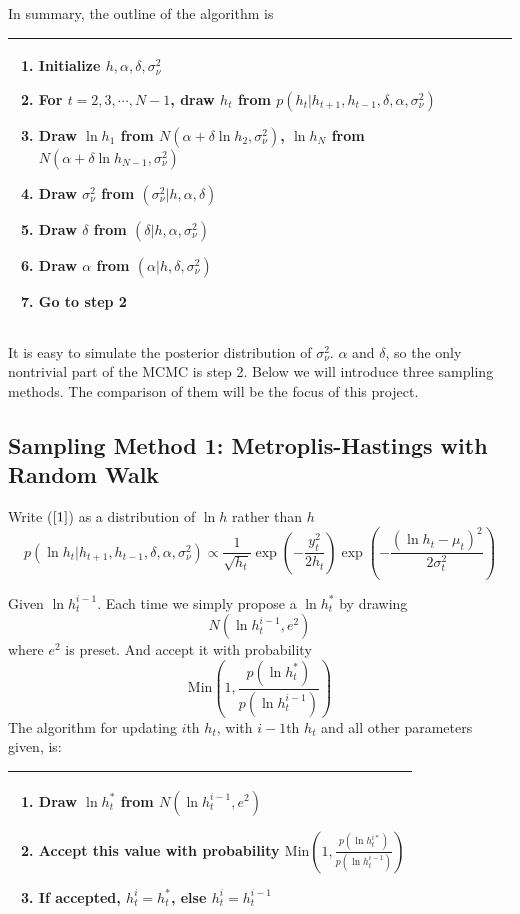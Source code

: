 \documentclass{article}
\begin{document}
In summary, the outline of the algorithm is

\begin{tabular}{|p{11cm}|}
\hline
\begin{enumerate}
\item
Initialize $h, \alpha,\delta,\sigma_\nu^2$
\item
For $t=2,3,\cdots,N-1$, draw $h_t$ from  $p(h_t|h_{t+1},h_{t-1},\delta,\alpha,\sigma_\nu^2)$
\item
Draw $\ln h_1$ from $N(\alpha+\delta\ln h_2, \sigma_\nu^2)$, $\ln h_N$ from $N(\alpha+\delta\ln h_{N-1}, \sigma_\nu^2)$
\item
Draw $\sigma_\nu^2$ from $(\sigma_\nu^2|h,\alpha,\delta)$
\item
Draw $\delta$ from $(\delta|h,\alpha,\sigma_\nu^2)$
\item
Draw $\alpha$ from $(\alpha|h,\delta,\sigma_\nu^2)$
\item
Go to step 2
\end{enumerate}\\
\hline
\end{tabular}

It is easy to simulate the posterior distribution of $\sigma_\nu^2$. $\alpha$ and $\delta$, so the only nontrivial part of the MCMC is step 2. Below we will introduce three sampling methods. The comparison of them will be the focus of this project.

\subsection{Sampling Method 1: Metroplis-Hastings with Random Walk}
Write ($\ref{1}$) as a distribution of $\ln h$ rather than $h$
\[
p(\ln h_t|h_{t+1},h_{t-1},\delta,\alpha,\sigma_\nu^2)\propto\frac{1}{\sqrt{h_t}}\exp\left(-\frac{y_t^2}{2h_t}\right)\exp\left(-\frac{(\ln h_t-\mu_t)^2}{2\sigma_t^2}\right)
\]

Given $\ln h^{i-1}_t$. Each time we simply propose a $\ln h^*_t$ by drawing
\[
N(\ln h^{i-1}_t,e^2)
\]
where $e^2$ is preset. And accept it with probability
\[
\textrm{Min}(1,\frac{p(\ln h^*_t)}{p(\ln h^{i-1}_t)})
\]
The algorithm for updating $i$th $h_t$, with $i-1$th $h_t$ and all other parameters given, is:

\begin{tabular}{|p{11cm}|}
\hline
\begin{enumerate}
\item
Draw $\ln h^*_t$ from $N(\ln h^{i-1}_t,e^2)$
\item
Accept this value with probability $\textrm{Min}(1,\frac{p(\ln h^{i*}_t)}{p(\ln h^{i-1}_t)})$
\item
If accepted, $h^i_t=h^*_t$, else $h^i_t=h^{i-1}_t$
\end{enumerate}\\
\hline
\end{tabular}
\end{document}
